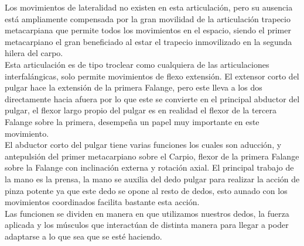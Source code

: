 \documentclass{article}
\begin{document}
Los movimientos de lateralidad no existen en esta articulación, pero su ausencia está ampliamente compensada por la gran movilidad de la articulación trapecio metacarpiana que permite todos los movimientos en el espacio, siendo el primer metacarpiano el gran beneficiado al estar el trapecio inmovilizado en la segunda hilera del carpo.\\
Esta articulación es de tipo troclear como cualquiera de las articulaciones interfalángicas, solo permite movimientos de flexo extensión.
El extensor corto del pulgar hace la extensión de la primera Falange, pero este lleva a los dos directamente hacia afuera por lo que este se convierte en el principal abductor del pulgar, el flexor largo propio del pulgar es en realidad el flexor de la tercera Falange sobre la primera, desempeña un papel muy importante en este movimiento.\\
El abductor corto del pulgar tiene varias funciones los cuales son aducción, y antepulsión del primer metacarpiano sobre el Carpio, flexor de la primera Falange sobre la Falange con inclinación externa y rotación axial.
El principal trabajo de la mano es la prensa, la mano se auxilia del dedo pulgar para realizar la acción de pinza potente ya que este dedo se opone al resto de dedos, esto aunado con los movimientos coordinados facilita bastante esta acción.\\
Las funcionen se dividen en manera en que utilizamos nuestros dedos, la fuerza aplicada y los músculos que interactúan de distinta manera para llegar a poder adaptarse a lo que sea que se esté haciendo.
\end{document}
